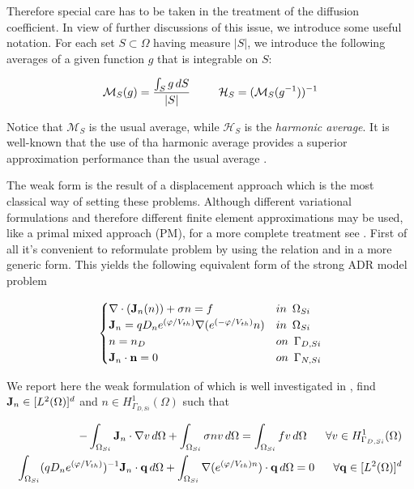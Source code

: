 Therefore special care has to be taken in the treatment of the diffusion coefficient. In view of further discussions of this issue, we introduce some useful notation. For each set $S \subset \Omega$ having measure $|S|$, we introduce the following averages of a given function $g$ that is integrable on $S$:

\begin{equation*}
\mathcal{M}_S(g) = \dfrac{\int_S g \, dS}{|S|} \psp{15} \mathcal{H}_S = (\mathcal{M}_S(g^{-1}))^{-1} 
\end{equation*}

Notice that $\mathcal{M}_S$ is the usual average, while $\mathcal{H}_S$ is the \textit{harmonic average}. It is well-known that the use of tha harmonic average provides a superior approximation performance than the usual average \cite{BabuskaMixMet}.


The weak form   is the result of a displacement approach which is the most classical way of setting these problems.
Although different variational formulations and therefore different finite element approximations may be used, like a primal mixed approach (PM), for a more complete treatment see \cite{TesiDotDeFalco}.  First of all it's convenient to reformulate problem  by using the relation  and  in a more generic form. This yields the following equivalent form of the strong ADR model problem 

\begin{equation}
\label{eq: LEC system slotboom generic}
\begin{cases}
\nabla \cdot (\vect{J}_n(n) ) +\sigma n = f & in \psp{3} \Omega_{Si}
 \\
 \vect{J}_n = qD_n e^{(\varphi/V_{th})} \nabla (e^{(-\varphi/V_{th})}n) & in \psp{3} \Omega_{Si}\\
n = n_D & on \psp{3} \Gamma_{D,Si}
 \\
 \vect{J}_n \cdot \vect{n} = 0 & on \psp{3} \Gamma_{N,Si}
\end{cases}
\end{equation}

We report here the weak formulation of  which is well investigated in \cite{TesiDotDeFalco}, find $\mathbf{J}_n \in [L^2(\Omega)]^d$ and $n \in H^1_{\Gamma_{D,Si}}(\Omega)$ such that

\begin{align}
- \int_{\Omega_{Si}} \vect{J}_n\cdot \nabla v \, d\Omega + \int_{\Omega_{Si}} \sigma n v \, d\Omega = \int_{\Omega_{Si}} f v \, d\Omega \psp{10} \forall v \in H^1_{\Gamma_{D,Si}}(\Omega)
\label{eq: weak form PM1} \\
\int_{\Omega_{Si}} (qD_n e^{(\varphi/V_{th})})^{-1} \vect{J}_n\cdot \vect{q} \, d\Omega + \int_{\Omega_{Si}} \nabla(e^{(\varphi/V_{th})n}) \cdot \vect{q} \, d\Omega = 0 \psp{10} \forall \vect{q} \in [L^2(\Omega)]^d \label{eq: weak form PM2} 
\end{align}


